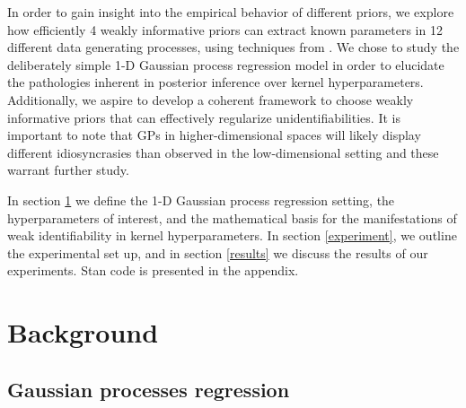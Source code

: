 \documentclass{article}
\begin{document}
In order to gain insight into the empirical behavior of different priors, we
explore how efficiently 4 weakly informative priors can extract known
parameters in 12 different data generating processes, using techniques from
\citet{cook2012validation}. We chose to study the deliberately simple 1-D
Gaussian process regression model in order to elucidate the pathologies
inherent in posterior inference over kernel hyperparameters. Additionally, we
aspire to develop a coherent framework to choose weakly informative priors that
can effectively regularize unidentifiabilities. It is important to note that
GPs in higher-dimensional spaces will likely display different idiosyncrasies
than observed in the low-dimensional setting and these warrant further study.

In section \ref{background} we define the 1-D Gaussian process regression setting,
the hyperparameters of interest, and the mathematical basis for the manifestations
of weak identifiability in kernel hyperparameters. In section \ref{experiment}, we 
outline the experimental set up, and in section \ref{results} we discuss the results 
of our experiments. Stan code is presented in the appendix.

\section{Background} \label{background}

\subsection{Gaussian processes regression}
\end{document}

